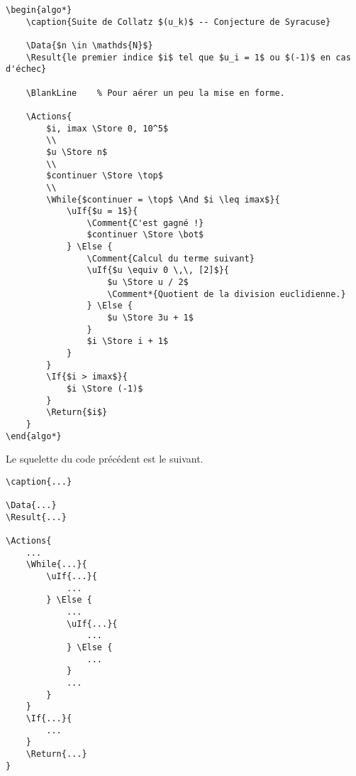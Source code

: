 \begin{frame-gene}
    \small
    \begin{verbatim}
\begin{algo*}
    \caption{Suite de Collatz $(u_k)$ -- Conjecture de Syracuse}

    \Data{$n \in \mathds{N}$}
    \Result{le premier indice $i$ tel que $u_i = 1$ ou $(-1)$ en cas d'échec}

    \BlankLine    % Pour aérer un peu la mise en forme.

    \Actions{
        $i, imax \Store 0, 10^5$
        \\
        $u \Store n$
        \\
        $continuer \Store \top$
        \\
        \While{$continuer = \top$ \And $i \leq imax$}{
            \uIf{$u = 1$}{
                \Comment{C'est gagné !}
                $continuer \Store \bot$
            } \Else {
                \Comment{Calcul du terme suivant}
                \uIf{$u \equiv 0 \,\, [2]$}{
                    $u \Store u / 2$
                    \Comment*{Quotient de la division euclidienne.}
                } \Else {
                    $u \Store 3u + 1$
                }
                $i \Store i + 1$
            }
        }
        \If{$i > imax$}{
            $i \Store (-1)$
        }
        \Return{$i$}
    }
\end{algo*}
    \end{verbatim}
\end{frame-gene}


Le squelette du code précédent est le suivant. 


\begin{frame-gene}
    \small
    \begin{verbatim}
\caption{...}

\Data{...}
\Result{...}

\Actions{
    ...
    \While{...}{
        \uIf{...}{
            ...
        } \Else {
            ...
            \uIf{...}{
                ...
            } \Else {
                ...
            }
            ...
        }
    }
    \If{...}{
        ...
    }
    \Return{...}
}
    \end{verbatim}
\end{frame-gene}
